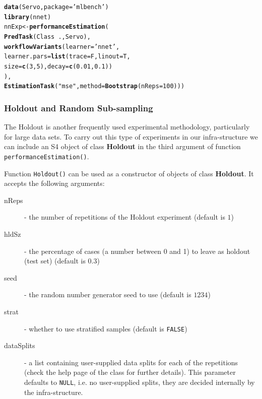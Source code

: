 \documentclass[10pt,a4paper]{article}\usepackage[]{graphicx}\usepackage[]{color}
\makeatletter
\newcommand{\hlnum}[1]{\textcolor[rgb]{0.686,0.059,0.569}{#1}}%
\newcommand{\hlstr}[1]{\textcolor[rgb]{0.192,0.494,0.8}{#1}}%
\newcommand{\hlopt}[1]{\textcolor[rgb]{0,0,0}{#1}}%
\newcommand{\hlstd}[1]{\textcolor[rgb]{0.345,0.345,0.345}{#1}}%
\newcommand{\hlkwb}[1]{\textcolor[rgb]{0.69,0.353,0.396}{#1}}%
\newcommand{\hlkwc}[1]{\textcolor[rgb]{0.333,0.667,0.333}{#1}}%
\newcommand{\hlkwd}[1]{\textcolor[rgb]{0.737,0.353,0.396}{\textbf{#1}}}%
\newenvironment{kframe}{%
 \def\at@end@of@kframe{}%
 \ifinner\ifhmode%
  \def\at@end@of@kframe{\end{minipage}}%
  \begin{minipage}{\columnwidth}%
 \fi\fi%
 \def\FrameCommand##1{\hskip\@totalleftmargin \hskip-\fboxsep
 \colorbox{shadecolor}{##1}\hskip-\fboxsep
     \hskip-\linewidth \hskip-\@totalleftmargin \hskip\columnwidth}%
 \MakeFramed {\advance\hsize-\width
   \@totalleftmargin\z@ \linewidth\hsize
   \@setminipage}}%
 {\par\unskip\endMakeFramed%
 \at@end@of@kframe}
\newenvironment{knitrout}{}{} %
\makeatother
\begin{document}
\begin{knitrout}\footnotesize
{}\color{fgcolor}\begin{kframe}
\begin{alltt}
\hlkwd{data}\hlstd{(Servo,}\hlkwc{package}\hlstd{=}\hlstr{'mlbench'}\hlstd{)}
\hlkwd{library}\hlstd{(nnet)}
\hlstd{nnExp} \hlkwb{<-} \hlkwd{performanceEstimation}\hlstd{(}
  \hlkwd{PredTask}\hlstd{(Class} \hlopt{~} \hlstd{.,Servo),}
  \hlkwd{workflowVariants}\hlstd{(}\hlkwc{learner}\hlstd{=}\hlstr{'nnet'}\hlstd{,}
                   \hlkwc{learner.pars}\hlstd{=}\hlkwd{list}\hlstd{(}\hlkwc{trace}\hlstd{=F,}\hlkwc{linout}\hlstd{=T,}
                       \hlkwc{size}\hlstd{=}\hlkwd{c}\hlstd{(}\hlnum{3}\hlstd{,}\hlnum{5}\hlstd{),}\hlkwc{decay}\hlstd{=}\hlkwd{c}\hlstd{(}\hlnum{0.01}\hlstd{,}\hlnum{0.1}\hlstd{))}
          \hlstd{),}
  \hlkwd{EstimationTask}\hlstd{(}\hlstr{"mse"}\hlstd{,}\hlkwc{method}\hlstd{=}\hlkwd{Bootstrap}\hlstd{(}\hlkwc{nReps}\hlstd{=}\hlnum{100}\hlstd{)))}
\end{alltt}
\end{kframe}
\end{knitrout}

\subsubsection{Holdout and Random Sub-sampling}

The Holdout is another frequently used experimental methodology,
particularly for large data sets. To carry out this type of
experiments in our infra-structure we can include an S4 object of
class \textbf{Holdout} in the third argument of function
\texttt{performanceEstimation()}.

Function \texttt{Holdout()} can be used as a constructor of
objects of class \textbf{Holdout}. It accepts the following
arguments:

\begin{description}
\item[nReps] - the number of repetitions of the Holdout experiment (default is $1$)
\item[hldSz] - the percentage  of cases (a number between 0 and 1) to leave as holdout (test set) (default is $0.3$)
\item[seed] - the random number generator seed to use (default is $1234$)
\item[strat] - whether to use stratified samples (default is \texttt{FALSE})
\item[dataSplits] - a list containing user-supplied data splits
  for each of the repetitions (check the help page of the
  class for further details). This parameter defaults to
  \texttt{NULL}, i.e. no user-supplied splits, they are decided
  internally by the infra-structure.
\end{description}
\end{document}

